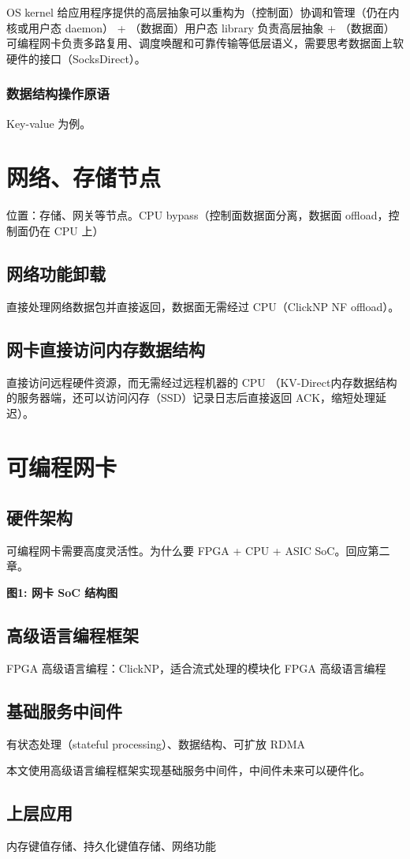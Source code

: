 OS kernel 给应用程序提供的高层抽象可以重构为（控制面）协调和管理（仍在内核或用户态 daemon） + （数据面）用户态 library 负责高层抽象 + （数据面）可编程网卡负责多路复用、调度唤醒和可靠传输等低层语义，需要思考数据面上软硬件的接口（SocksDirect）。

\subsubsection{数据结构操作原语}

Key-value 为例。

\section{网络、存储节点}

位置：存储、网关等节点。CPU bypass（控制面数据面分离，数据面 offload，控制面仍在 CPU 上）

\subsection{网络功能卸载}

直接处理网络数据包并直接返回，数据面无需经过 CPU（ClickNP NF offload）。

\subsection{网卡直接访问内存数据结构}

直接访问远程硬件资源，而无需经过远程机器的 CPU （KV-Direct内存数据结构的服务器端，还可以访问闪存（SSD）记录日志后直接返回 ACK，缩短处理延迟）。


\section{可编程网卡}

\subsection{硬件架构}

可编程网卡需要高度灵活性。为什么要 FPGA + CPU + ASIC SoC。回应第二章。

\textbf{图1: 网卡 SoC 结构图}

\subsection{高级语言编程框架}

FPGA 高级语言编程：ClickNP，适合流式处理的模块化 FPGA 高级语言编程

\subsection{基础服务中间件}

有状态处理（stateful processing）、数据结构、可扩放 RDMA

本文使用高级语言编程框架实现基础服务中间件，中间件未来可以硬件化。

\subsection{上层应用}

内存键值存储、持久化键值存储、网络功能